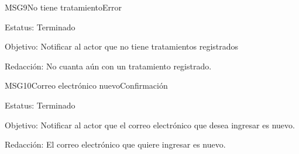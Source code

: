 \begin{mensaje}{MSG9}{No tiene tratamiento}{Error}
	\item[Estatus:] Terminado
	\item[Objetivo:] Notificar al actor que no tiene tratamientos registrados
	\item[Redacción:] No cuanta aún con un tratamiento registrado.
\end{mensaje}

\begin{mensaje}{MSG10}{Correo electrónico nuevo}{Confirmación}
	\item[Estatus:] Terminado
	\item[Objetivo:] Notificar al actor que el correo electrónico que desea ingresar es nuevo.
	\item[Redacción:] El correo electrónico que quiere ingresar es nuevo.
\end{mensaje}

